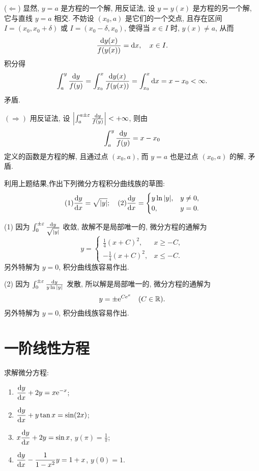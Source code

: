 \begin{solution}
  ($\Leftarrow$) 显然, $y=a$ 是方程的一个解, 用反证法, 设 $y=y(x)$ 是方程的另一个解, 
  它与直线 $y=a$ 相交. 不妨设 $(x_0,a)$ 是它们的一个交点, 
  且存在区间 $I=(x_0,x_0+\delta)$ 或 $I=(x_0-\delta,x_0)$, 
  使得当 $x\in I$ 时, $y(x)\neq a$, 从而
  \[\frac{\mathop{}\!\mathrm{d} y(x)}{f(y(x))}=\mathop{}\!\mathrm{d} x,\quad x\in I.\]
  积分得
  \[\int_a^y\frac{\mathop{}\!\mathrm{d} y}{f(y)}=\int_{x_0}^x\frac{\mathop{}\!\mathrm{d} y(x)}{f(y(x))}
    = \int_{x_0}^x\mathop{}\!\mathrm{d} x = x-x_0<\infty.\]
  矛盾.

  $(\Rightarrow)$ 用反证法, 设 $\left|\int_a^{a\pm\varepsilon}\frac{\mathop{}\!\mathrm{d} y}{f(y)}\right|<+\infty$,
  则由
  \[\int_a^y\frac{\mathop{}\!\mathrm{d} y}{f(y)}=x-x_0\]
  定义的函数是方程的解, 且通过点 $(x_0,a)$, 而 $y=a$ 也是过点 $(x_0,a)$ 的解, 矛盾.
\end{solution}



\begin{exercise}
  利用上题结果,作出下列微分方程积分曲线族的草图:
  \[(1)\frac{\mathop{}\!\mathrm{d} y}{\mathop{}\!\mathrm{d} x}=\sqrt{|y|};\quad
  (2)\frac{\mathop{}\!\mathrm{d} y}{\mathop{}\!\mathrm{d} x}=
  \begin{cases}
    y\ln|y|, & y\neq 0, \\
    0,       & y=0.
  \end{cases}\]
\end{exercise}

\begin{solution}
(1) 因为 $\int_0^{\pm\varepsilon}\frac{\mathop{}\!\mathrm{d} y}{\sqrt{|y|}}$ 收敛, 故解不是局部唯一的, 微分方程的通解为
\[y=
  \begin{cases}
    \frac{1}{4}(x+C)^2,  & x\geq -C, \\
    -\frac{1}{4}(x+C)^2, & x\leq -C.
  \end{cases}\]
另外特解为 $y=0$, 积分曲线族容易作出.

(2) 因为 $\int_0^{\pm\varepsilon}\frac{\mathop{}\!\mathrm{d} y}{y\ln|y|}$ 发散, 所以解是局部唯一的, 微分方程的通解为
\[y=\pm\mathrm{e}^{C\mathrm{e}^x}\quad(C\in\mathbb{R}).\]
另外特解为 $y=0$, 积分曲线族容易作出.
\end{solution}



\section{一阶线性方程}



\begin{exercise}
  求解微分方程:
  \begin{enumerate}[(1)]
  \item $\displaystyle\frac{\mathop{}\!\mathrm{d} y}{\mathop{}\!\mathrm{d} x}+2y=x\mathrm{e}^{-x}$;
  \item $\displaystyle\frac{\mathop{}\!\mathrm{d} y}{\mathop{}\!\mathrm{d} x}+y\tan x=\sin(2x)$;
  \item $\displaystyle x\frac{\mathop{}\!\mathrm{d} y}{\mathop{}\!\mathrm{d} x}+2y=\sin x$, $y(\pi)=\frac{1}{\pi}$;
  \item $\displaystyle\frac{\mathop{}\!\mathrm{d} y}{\mathop{}\!\mathrm{d} x}-\frac{1}{1-x^2}y=1+x$, $y(0)=1$.
  \end{enumerate}
\end{exercise}

